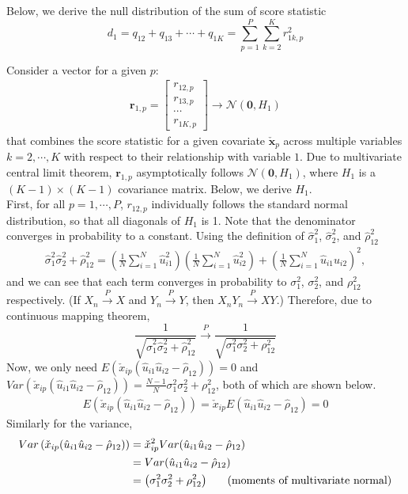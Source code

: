 \documentclass[aoas,authoryear, preprint]{imsart}
\numberwithin{equation}{section}
\theoremstyle{plain}
\begin{document}
Below, we derive the null distribution of the sum of score statistic
$$d_1 = q_{12} + q_{13} + \cdots + q_{1K} = \sum_{p=1}^{P}\sum_{k=2}^{K} r_{1k,p}^2$$

Consider a vector for a given $p$:
\begin{align*}
    \bm{r}_{1,p} = \begin{bmatrix} r_{12,p} \\ r_{13,p} \\ \cdots \\ r_{1K,p}\end{bmatrix} \rightarrow \mathcal{N}(\bm{0}, H_1)
\end{align*}
that combines the score statistic for a given covariate $\check{\bm{x}}_p$ across multiple variables $k = 2, \cdots, K$ with respect to their relationship with variable $1$. Due to multivariate central limit theorem, $\bm{r}_{1,p}$ asymptotically follows $\mathcal{N}(\bm{0}, H_1)$, where $H_1$ is a $(K-1) \times (K-1)$ covariance matrix. 
Below, we derive $H_1$. \\

First, for all $p = 1, \cdots, P$, $r_{12,p}$ individually follows the standard normal distribution, so that all diagonals of $H_1$ is 1. Note that the denominator converges in probability to a constant. Using the definition of $\hat{\sigma}_1^2$, $\hat{\sigma}_2^2$, and $\hat{\rho}_{12}^2$
\begin{align*}
\hat{\sigma}_1^2\hat{\sigma}_2^2+\hat{\rho}_{12}^2 = 
\left( \frac{1}{N} \sum_{i=1}^{N} \hat{u}_{i1}^2\right)
\left( \frac{1}{N} \sum_{i=1}^{N} \hat{u}_{i2}^2\right) + 
\left( \frac{1}{N} \sum_{i=1}^{N} \hat{u}_{i1}\hat{u}_{i2}\right)^2,
\end{align*}
and we can see that each term converges in probability to $\sigma_1^2$, $\sigma_2^2$, and $\rho_{12}^2$ respectively. (If $X_n \xrightarrow{P} X$ and $Y_n \xrightarrow{P} Y$, then $X_nY_n\xrightarrow{P} XY$.) Therefore, due to continuous mapping theorem, 
$$\frac{1}{\sqrt{\hat{\sigma}_1^2\hat{\sigma}_2^2 + \hat{\rho}_{12}^2}} \xrightarrow{P} \frac{1}{\sqrt{\sigma_1^2\sigma_2^2+\rho_{12}^2}}$$
Now, we only need $E(\check{x}_{ip}(\hat{u}_{i1}\hat{u}_{i2} - \hat{\rho}_{12})) = 0$ and $Var(\check{x}_{ip}(\hat{u}_{i1}\hat{u}_{i2} - \hat{\rho}_{12})) =\frac{N-1}{N} \sigma_1^2\sigma_2^2+\rho_{12}^2$, both of which are shown below.
\begin{align*}
E \left(\check{x}_{ip}(\hat{u}_{i1}\hat{u}_{i2}-\hat{\rho}_{12})\right) = \check{x}_{ip} E(\hat{u}_{i1}\hat{u}_{i2} - \hat{\rho}_{12}) = 0
\end{align*}
Similarly for the variance,
\begin{align*}
Var\left(\check{x}_{ip}(\hat{u}_{i1}\hat{u}_{i2} - \hat{\rho}_{12})\right)
&= \check{x}_{ip}^2 Var(\hat{u}_{i1}\hat{u}_{i2} - \hat{\rho}_{12}) \\
&=Var(\hat{u}_{i1}\hat{u}_{i2} - \hat{\rho}_{12})\\ 
&= \left(\sigma_1^2\sigma_2^2+\rho_{12}^2\right) \hspace{6mm} \text{(moments of multivariate normal)}
\end{align*}
\end{document}
